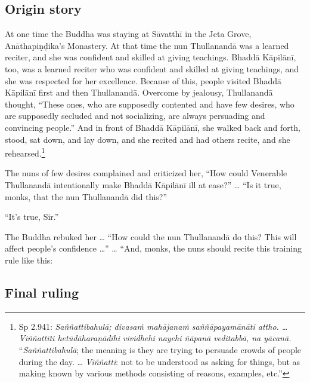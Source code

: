 \documentclass[12pt,openany]{book}%
\begin{document}
\subsection*{Origin story }

At one time the Buddha was staying at \textsanskrit{Sāvatthī} in the Jeta Grove, \textsanskrit{Anāthapiṇḍika}’s Monastery. At that time the nun \textsanskrit{Thullanandā} was a learned reciter, and she was confident and skilled at giving teachings. \textsanskrit{Bhaddā} \textsanskrit{Kāpilānī}, too, was a learned reciter who was confident and skilled at giving teachings, and she was respected for her excellence. Because of this, people visited \textsanskrit{Bhaddā} \textsanskrit{Kāpilānī} first and then \textsanskrit{Thullanandā}. Overcome by jealousy, \textsanskrit{Thullanandā} thought, “These ones, who are supposedly contented and have few desires, who are supposedly secluded and not socializing, are always persuading and convincing people.” And in front of \textsanskrit{Bhaddā} \textsanskrit{Kāpilānī}, she walked back and forth, stood, sat down, and lay down, and she recited and had others recite, and she rehearsed.\footnote{Sp 2.941: \textit{\textsanskrit{Saññattibahulā}; \textsanskrit{divasaṁ} \textsanskrit{mahājanaṁ} \textsanskrit{saññāpayamānāti} attho. … \textsanskrit{Viññattīti} \textsanskrit{hetūdāharaṇādīhi} vividhehi nayehi \textsanskrit{ñāpanā} \textsanskrit{veditabbā}, na \textsanskrit{yācanā}.} “\textit{\textsanskrit{Saññattibahulā}}; the meaning is they are trying to persuade crowds of people during the day. … \textit{\textsanskrit{Viññatti}}: not to be understood as asking for things, but as making known by various methods consisting of reasons, examples, etc.” } 

The nuns of few desires complained and criticized her, “How could Venerable \textsanskrit{Thullanandā} intentionally make \textsanskrit{Bhaddā} \textsanskrit{Kāpilānī} ill at ease?” … “Is it true, monks, that the nun \textsanskrit{Thullanandā} did this?” 

“It’s true, Sir.” 

The Buddha rebuked her … “How could the nun \textsanskrit{Thullanandā} do this? This will affect people’s confidence …” … “And, monks, the nuns should recite this training rule like this: 

\subsection*{Final ruling }
\end{document}
